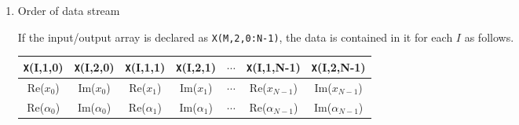 \documentclass[a4paper]{scrartcl}
\begin{document}
\begin{enumerate}
  \item Order of data stream

  If the input/output array is declared as \texttt{X(M,2,0:N-1)},
  the data is contained in it for each $I$ as follows.

    \begin{tabular}{|c|c|c|c|c|c|c|}\hline
     \texttt X(I,1,0) & \texttt X(I,2,0) & \texttt X(I,1,1) & \texttt X(I,2,1) & 
     $\cdots$ & \texttt X(I,1,N-1) & \texttt X(I,2,N-1) \\\hline\hline
      \mbox{Re}($x_0$) & \mbox{Im}($x_0$) & \mbox{Re}($x_1$) & \mbox{Im}($x_1$) &
     $\cdots$ & \mbox{Re}($x_{N-1}$) & \mbox{Im}($x_{N-1}$) \\\hline
      \mbox{Re}($\alpha_0$) & \mbox{Im}($\alpha_0$) & \mbox{Re}($\alpha_1$) & \mbox{Im}($\alpha_1$) &
     $\cdots$ & \mbox{Re}($\alpha_{N-1}$) & \mbox{Im}($\alpha_{N-1}$) \\\hline
    \end{tabular}

\end{enumerate}

\newpage
\end{document}
